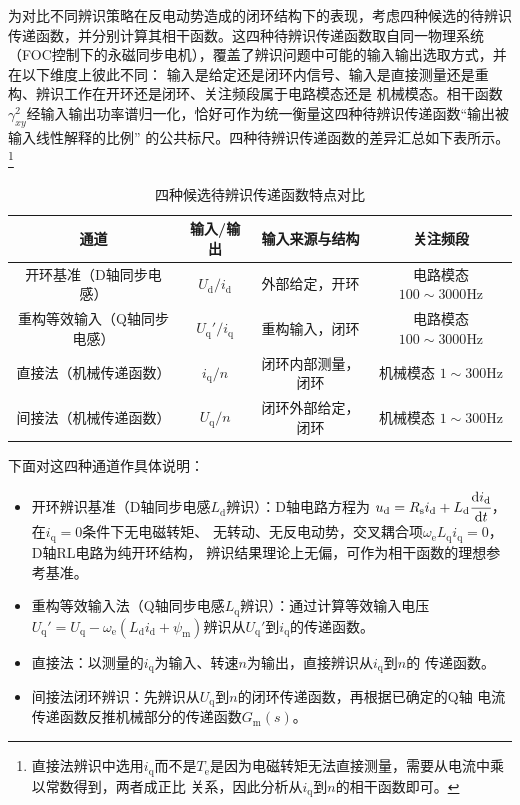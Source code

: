 为对比不同辨识策略在反电动势造成的闭环结构下的表现，考虑四种候选的待辨识传递函数，并分别计算其相干函数。这四种待辨识传递函数取自同一物理系统
（FOC控制下的永磁同步电机），覆盖了辨识问题中可能的输入输出选取方式，并在以下维度上彼此不同：
输入是给定还是闭环内信号、输入是直接测量还是重构、辨识工作在开环还是闭环、关注频段属于电路模态还是
机械模态。相干函数\(\gamma_{xy}^2\)经输入输出功率谱归一化，恰好可作为统一衡量这四种待辨识传递函数“输出被输入线性解释的比例”
的公共标尺。四种待辨识传递函数的差异汇总如下表所示。
\footnote{直接法辨识中选用\(i_\mathrm{q}\)而不是\(T_{\mathrm{e}}\)是因为电磁转矩无法直接测量，需要从电流中乘以常数得到，两者成正比
关系，因此分析从\(i_{\mathrm{q}}\)到\(n\)的相干函数即可。} 
\begin{table}[H]
    \centering
    \begin{tabular}{|c|c|c|c|}
        \hline
        通道 & 输入/输出 & 输入来源与结构 & 关注频段\\
        \hline
        开环基准（D轴同步电感） & \(U_{\mathrm{d}}/i_{\mathrm{d}}\) & 外部给定，开环 & 电路模态 \(100\sim3000\)Hz\\
        \hline
        重构等效输入（Q轴同步电感） & \(U_{\mathrm{q}}'/i_{\mathrm{q}}\) & 重构输入，闭环 & 电路模态 \(100\sim3000\)Hz\\
        \hline
        直接法（机械传递函数） & \(i_{\mathrm{q}}/n\) & 闭环内部测量，闭环 & 机械模态 \(1\sim300\)Hz\\
        \hline
        间接法（机械传递函数） & \(U_{\mathrm{q}}/n\) & 闭环外部给定，闭环 & 机械模态 \(1\sim300\)Hz\\
        \hline
    \end{tabular}
    \caption{四种候选待辨识传递函数特点对比}
    \label{tab:四种候选待辨识传递函数特点对比}
\end{table}

下面对这四种通道作具体说明：
\begin{itemize}
    \item 开环辨识基准（D轴同步电感\(L_{\mathrm{d}}\)辨识）：D轴电路方程为
\(u_{\mathrm{d}}=R_{\mathrm{s}}i_{\mathrm{d}}+L_{\mathrm{d}}\cfrac{\mathrm{d} i_{\mathrm{d}}}{\mathrm{d} t}\)，在\(i_{\mathrm{q}}=0\)条件下无电磁转矩、
无转动、无反电动势，交叉耦合项\(\omega_{\mathrm{e}}L_{\mathrm{q}}i_{\mathrm{q}}=0\)，D轴RL电路为纯开环结构，
辨识结果理论上无偏，可作为相干函数的理想参考基准。
    \item 重构等效输入法（Q轴同步电感\(L_{\mathrm{q}}\)辨识）：通过计算等效输入电压
\(U_{\mathrm{q}}'=U_{\mathrm{q}}-\omega_{\mathrm{e}}(L_{\mathrm{d}}i_{\mathrm{d}}+\psi_{\mathrm{m}})\)辨识从\(U_{\mathrm{q}}'\)到\(i_{\mathrm{q}}\)的传递函数。
    \item 直接法：以测量的\(i_{\mathrm{q}}\)为输入、转速\(n\)为输出，直接辨识从\(i_{\mathrm{q}}\)到\(n\)的
传递函数。
    \item 间接法闭环辨识：先辨识从\(U_{\mathrm{q}}\)到\(n\)的闭环传递函数，再根据已确定的Q轴
电流传递函数反推机械部分的传递函数\(G_{\mathrm{m}}(s)\)。
\end{itemize}

